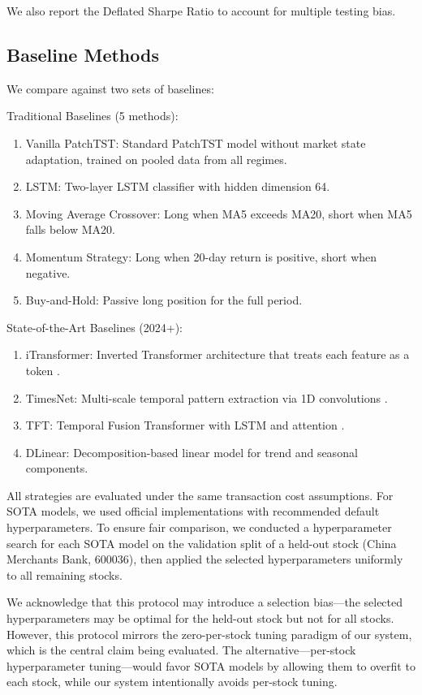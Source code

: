 \documentclass[review]{elsarticle}
\begin{document}
We also report the Deflated Sharpe Ratio \citep{bailey2014pseudo} to account for multiple testing bias.

\subsection{Baseline Methods}

We compare against two sets of baselines:

Traditional Baselines (5 methods):
\begin{enumerate}
\item Vanilla PatchTST: Standard PatchTST model without market state adaptation, trained on pooled data from all regimes.
\item LSTM: Two-layer LSTM classifier with hidden dimension 64.
\item Moving Average Crossover: Long when MA5 exceeds MA20, short when MA5 falls below MA20.
\item Momentum Strategy: Long when 20-day return is positive, short when negative.
\item Buy-and-Hold: Passive long position for the full period.
\end{enumerate}

State-of-the-Art Baselines (2024+):
\begin{enumerate}
\item iTransformer: Inverted Transformer architecture that treats each feature as a token \citep{liu2024itransformer}.
\item TimesNet: Multi-scale temporal pattern extraction via 1D convolutions \citep{wu2023timesnet}.
\item TFT: Temporal Fusion Transformer with LSTM and attention \citep{lim2021temporal}.
\item DLinear: Decomposition-based linear model for trend and seasonal components.
\end{enumerate}

All strategies are evaluated under the same transaction cost assumptions. For SOTA models, we used official implementations with recommended default hyperparameters. To ensure fair comparison, we conducted a hyperparameter search for each SOTA model on the validation split of a held-out stock (China Merchants Bank, 600036), then applied the selected hyperparameters uniformly to all remaining stocks.

We acknowledge that this protocol may introduce a selection bias---the selected hyperparameters may be optimal for the held-out stock but not for all stocks. However, this protocol mirrors the zero-per-stock tuning paradigm of our system, which is the central claim being evaluated. The alternative---per-stock hyperparameter tuning---would favor SOTA models by allowing them to overfit to each stock, while our system intentionally avoids per-stock tuning.
\end{document}
